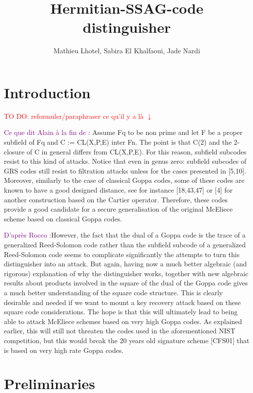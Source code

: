 \documentclass[a4paper]{article}
\title{Hermitian-SSAG-code distinguisher}
\author{Mathieu Lhotel, Sabira El Khalfaoui, Jade Nardi}
\date{}
\newcommand\jade[1]{\textcolor{purple}{#1}}
\newcommand\TODO[1]{\textcolor{red}{TO DO: #1}}
\begin{document}
\maketitle

\section{Introduction}

\TODO{reformuler/paraphraser ce qu'il y a là $\downarrow$}

\jade{Ce que dit Alain à la fin de \cite{CMR17} :} 
Assume Fq to be non prime and let F be a proper subfield of Fq and C := CL(X,P,E) inter Fn. The point is that C(2) and the 2-closure of C in general differs from CL(X,P,E). For this reason, subfield subcodes resist to this kind of attacks. Notice that even
in genus zero: subfield subcodes of GRS codes still resist to filtration attacks unless for the cases presented in [5,10]. Moreover, similarly to the case of classical Goppa codes, some of these codes are known to have a good designed distance, see for instance [18,43,47] or [4] for another construction based on the Cartier operator. Therefore, these codes provide a good candidate for a secure generalisation of the original McEliece scheme based on classical Goppa codes.

\jade{D'après Rocco \cite{rocco} :}However, the fact that the dual of a Goppa code is the trace of a generalized Reed-Solomon code rather than the subfield subcode of a generalized Reed-Solomon code seems to complicate significantly the attempts to turn this distinguisher into an attack. But again, having now a much better algebraic (and rigorous) explanation of why the distinguisher works, together with new
algebraic results about products involved in the square of the dual of the Goppa code gives a much better understanding of the square code structure. This is clearly desirable and needed if we want to mount a key recovery attack based on these square code considerations. The hope is that this will ultimately lead to being able to attack McEliece schemes based on very high Goppa codes. As explained earlier, this will still not threaten the codes used in the aforementioned NIST competition, but this would break the 20 years old signature scheme [CFS01] that is based on very high rate Goppa codes.

\section{Preliminaries}
\end{document}
